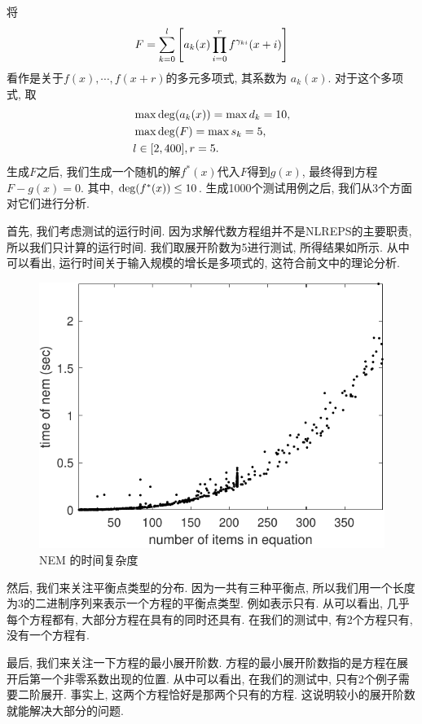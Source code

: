将 
\begin{equation}
    F=\sum_{k=0}^l{\left[a_k(x)\prod_{i=0}^r{f^{\gamma_{ki}}(x+i)}\right]}
\end{equation}
看作是关于$f(x),\cdots,f(x+r)$的多元多项式, 其系数为 $a_k(x)$. 对于这个多项式, 取
\begin{equation}
\begin{split}
&\max{\rm deg}(a_k(x))=\max d_k=10,\\ 
&\max{\rm deg}(F)=\max s_k=5, \\
&l\in [2,400], r=5.
\end{split}
\end{equation}
生成$F$之后, 我们生成一个随机的解$f^*(x)$代入$F$得到$g(x)$, 最终得到方程$F-g(x)=0$. 其中, ${\rm deg}(f^*(x))\le 10$. 生成1000个测试用例之后, 我们从3个方面对它们进行分析. 

首先, 我们考虑测试的运行时间. 因为求解代数方程组并不是NLREPS的主要职责, 所以我们只计算的运行时间. 我们取展开阶数为5进行测试, 所得结果如所示. 从中可以看出, 运行时间关于输入规模的增长是多项式的, 这符合前文中的理论分析. 
\begin{figure}[htbp]
\centering
\includegraphics[width=.7\textwidth]{fig/t-nem.pdf}
\caption{NEM 的时间复杂度}
\label{t-nem}
\end{figure}

然后, 我们来关注平衡点类型的分布. 因为一共有三种平衡点, 所以我们用一个长度为3的二进制序列来表示一个方程的平衡点类型. 例如表示只有\BPone{}. 从可以看出, 几乎每个方程都有\BPone{}, 大部分方程在具有\BPone{}的同时还具有\BPthree{}. 在我们的测试中, 有2个方程只有\BPthree{}, 没有一个方程有\BPtwo{}.


最后, 我们来关注一下方程的最小展开阶数. 方程的最小展开阶数指的是方程在展开后第一个非零系数出现的位置. 从中可以看出, 在我们的测试中, 只有2个例子需要二阶展开. 事实上, 这两个方程恰好是那两个只有\BPthree{}的方程. 这说明较小的展开阶数就能解决大部分的问题. 

